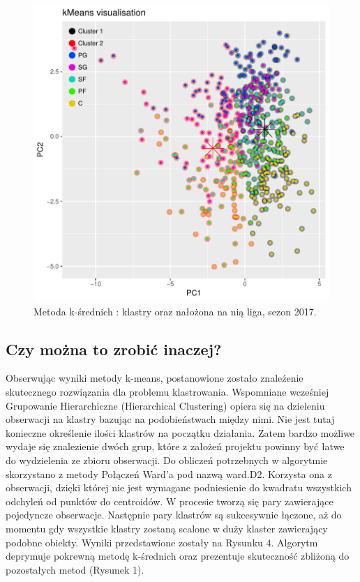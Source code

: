 \documentclass[twoside,twocolumn]{article}
\begin{document}
\begin{figure}[hbt!]
  \centering
    \includegraphics[width=\linewidth]{plot_kclust.pdf}
  \caption{Metoda k-średnich : klastry oraz nałożona na nią liga, sezon 2017.}
  \label{fig:coffee}
\end{figure}
\newpage
\subsection{Czy można to zrobić inaczej?}

\indent Obserwując wyniki metody k-means, postanowione zostało znaleźenie skutecznego rozwiązania dla problemu klastrowania. Wspomniane wcześniej Grupowanie Hierarchiczne (Hierarchical Clustering) opiera się na dzieleniu obserwacji na klastry bazując na podobieństwach między nimi. Nie jest tutaj konieczne określenie ilości klastrów na początku działania. Zatem bardzo możliwe wydaje się znalezienie dwóch grup, które z założeń projektu powinny być łatwe do wydzielenia ze zbioru obserwacji. Do obliczeń potrzebnych w algorytmie  skorzystano z metody Połączeń Ward'a pod nazwą ward.D2. Korzysta ona z obserwacji, dzięki której nie jest wymagane podniesienie do kwadratu wszystkich odchyleń od punktów do centroidów. W procesie tworzą się pary zawierające pojedyncze obserwacje. Następnie pary klastrów są sukcesywnie łączone, aż do momentu gdy wszystkie klastry zostaną scalone w duży klaster zawierający podobne obiekty. Wyniki przedstawione zostały na Rysunku 4. Algorytm deprymuje pokrewną metodę k-średnich oraz prezentuje skuteczność zbliżoną do pozostałych metod (Rysunek 1).
\end{document}
